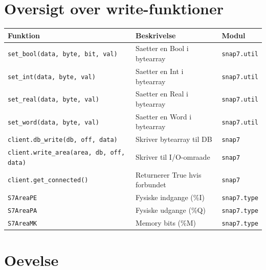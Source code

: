 \documentclass[12pt, a4paper]{article}
\begin{document}
\section{Oversigt over write-funktioner}

\begin{center}
\begin{tabular}{lp{5.5cm}l}
\toprule
\textbf{Funktion} & \textbf{Beskrivelse} & \textbf{Modul} \\
\midrule
\texttt{set\_bool(data, byte, bit, val)} & Saetter en Bool i bytearray & \texttt{snap7.util} \\
\texttt{set\_int(data, byte, val)}       & Saetter en Int i bytearray  & \texttt{snap7.util} \\
\texttt{set\_real(data, byte, val)}      & Saetter en Real i bytearray & \texttt{snap7.util} \\
\texttt{set\_word(data, byte, val)}      & Saetter en Word i bytearray & \texttt{snap7.util} \\
\texttt{client.db\_write(db, off, data)} & Skriver bytearray til DB    & \texttt{snap7} \\
\texttt{client.write\_area(area, db, off, data)} & Skriver til I/O-omraade & \texttt{snap7} \\
\texttt{client.get\_connected()}         & Returnerer True hvis forbundet & \texttt{snap7} \\
\texttt{S7AreaPE}                        & Fysiske indgange (\%I)      & \texttt{snap7.type} \\
\texttt{S7AreaPA}                        & Fysiske udgange (\%Q)       & \texttt{snap7.type} \\
\texttt{S7AreaMK}                        & Memory bits (\%M)           & \texttt{snap7.type} \\
\bottomrule
\end{tabular}
\end{center}

\section{Oevelse}
\end{document}
